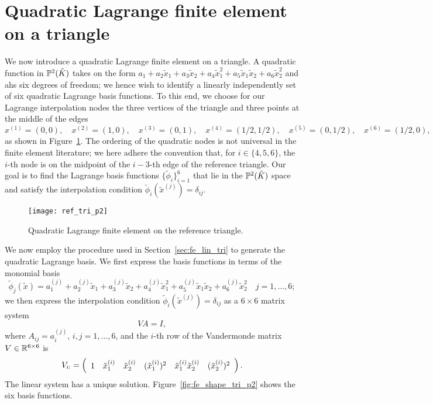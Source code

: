 \section{Quadratic Lagrange finite element on a triangle}
We now introduce a quadratic Lagrange finite element on a triangle. A quadratic function in $\PP^2(\tilde K)$ takes on the form $a_1 + a_2 \tilde x_1 + a_3 \tilde x_2 + a_4 \tilde x_1^2 + a_5 \tilde x_1 \tilde x_2 + a_6 \tilde x_2^2$ and ahs six degrees of freedom; we hence wish to identify a linearly independently set of six quadratic Lagrange basis functions.  To this end, we choose for our Lagrange interpolation nodes the three vertices of the triangle and three points at the middle of the edges
\begin{equation*}
  x^{(1)} = (0,0), \quad x^{(2)} = (1,0), \quad x^{(3)} = (0,1), \quad x^{(4)} = (1/2,1/2), \quad x^{(5)} = (0,1/2), \quad x^{(6)} = (1/2,0),
\end{equation*}
as shown in Figure~\ref{fig:fe_ref_tri_p2}.  The ordering of the quadratic nodes is not universal in the finite element literature; we here adhere the convention that, for $i \in \{4,5,6\}$, the $i$-th node is on the midpoint of the $i-3$-th edge of the reference triangle. Our goal is to find the Lagrange basis functions $\{\tilde \phi_i\}_{i=1}^6$ that lie in the $\PP^2(\tilde K)$ space and satisfy the interpolation condition $\tilde \phi_i(\tilde x^{(j)}) = \delta_{ij}$.

\begin{figure}
  \centering
  \texttt{[image: ref\_tri\_p2]}
  \caption{Quadratic Lagrange finite element on the reference triangle.}
  \label{fig:fe_ref_tri_p2}
\end{figure}


We now employ the procedure used in Section~\ref{sec:fe_lin_tri} to generate the quadratic Lagrange basis. We first express the basis functions in terms of the monomial basis
\begin{equation}
  \tilde \phi_j(\tilde x) = a_1^{(j)} + a_2^{(j)} \tilde x_1 + a_3^{(j)} \tilde x_2 + a_4^{(j)} \tilde x_1^2 + a_5^{(j)} \tilde x_1 \tilde x_2 + a_6^{(j)} \tilde x_2^2 \quad j = 1,\dots,6;
  \label{eq:fe_quad_tri_rep}
\end{equation}
we then express the interpolation condition $\tilde \phi_i(\tilde x^{(j)}) = \delta_{ij}$ as a $6 \times 6$ matrix system
\begin{equation*}
  V A = I,
\end{equation*}
where $A_{ij} = a^{(j)}_i$, $i,j = 1,\dots,6$, and the $i$-th row of the Vandermonde matrix $V \in \RR^{6 \times 6}$ is
\begin{equation*}
  V_{i:} = \bmat{cccccc} 1 & \tilde x^{(i)}_1 & \tilde x^{(i)}_2 &  (\tilde x^{(i)}_1)^2 & \tilde x^{(i)}_1 \tilde x^{(i)}_2 & (\tilde x^{(i)}_2)^2 \emat .
\end{equation*}
The linear system has a unique solution.  Figure~\ref{fig:fe_shape_tri_p2} shows the six basis functions.

